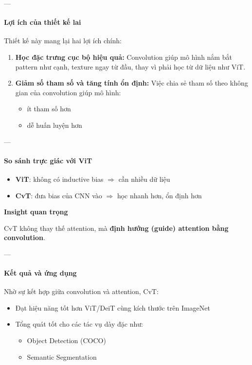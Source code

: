 ---

\paragraph{Lợi ích của thiết kế lai}

Thiết kế này mang lại hai lợi ích chính:

\begin{enumerate}
	\item \textbf{Học đặc trưng cục bộ hiệu quả:}  
	Convolution giúp mô hình nắm bắt pattern như cạnh, texture ngay từ đầu, thay vì phải học từ dữ liệu như ViT.
	
	\item \textbf{Giảm số tham số và tăng tính ổn định:}  
	Việc chia sẻ tham số theo không gian của convolution giúp mô hình:
	\begin{itemize}
		\item ít tham số hơn
		\item dễ huấn luyện hơn
	\end{itemize}
\end{enumerate}

---

\paragraph{So sánh trực giác với ViT}

\begin{itemize}
	\item \textbf{ViT}: không có inductive bias $\Rightarrow$ cần nhiều dữ liệu
	\item \textbf{CvT}: đưa bias của CNN vào $\Rightarrow$ học nhanh hơn, ổn định hơn
\end{itemize}

\begin{mdframed}[style=infobox]
	\textbf{Insight quan trọng}
	
	CvT không thay thế attention, mà \textbf{định hướng (guide) attention bằng convolution}.
\end{mdframed}

---

\paragraph{Kết quả và ứng dụng}

Nhờ sự kết hợp giữa convolution và attention, CvT:

\begin{itemize}
	\item Đạt hiệu năng tốt hơn ViT/DeiT cùng kích thước trên ImageNet
	\item Tổng quát tốt cho các tác vụ dày đặc như:
	\begin{itemize}
		\item Object Detection (COCO)
		\item Semantic Segmentation
	\end{itemize}
\end{itemize}


